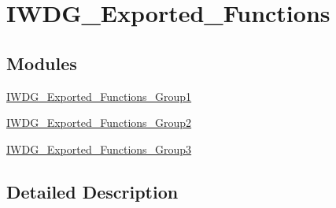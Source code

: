 \hypertarget{group___i_w_d_g___exported___functions}{}\section{I\+W\+D\+G\+\_\+\+Exported\+\_\+\+Functions}
\label{group___i_w_d_g___exported___functions}
\subsection*{Modules}
\begin{DoxyCompactItemize}
\item 
\hyperlink{group___i_w_d_g___exported___functions___group1}{I\+W\+D\+G\+\_\+\+Exported\+\_\+\+Functions\+\_\+\+Group1}
\item 
\hyperlink{group___i_w_d_g___exported___functions___group2}{I\+W\+D\+G\+\_\+\+Exported\+\_\+\+Functions\+\_\+\+Group2}
\item 
\hyperlink{group___i_w_d_g___exported___functions___group3}{I\+W\+D\+G\+\_\+\+Exported\+\_\+\+Functions\+\_\+\+Group3}
\end{DoxyCompactItemize}


\subsection{Detailed Description}
